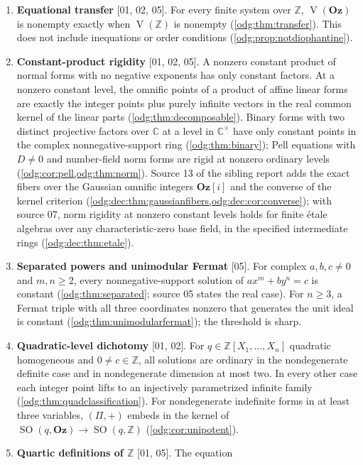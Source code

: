 \documentclass[11pt,oneside]{article}
\numberwithin{equation}{section}
\theoremstyle{definition}
\theoremstyle{remark}
\newcommand{\Oz}{\mathbf{Oz}}
\newcommand{\Z}{\mathbb Z}
\newcommand{\C}{\mathbb C}
\newcommand{\SO}{\operatorname{SO}}
\newcommand{\V}{\operatorname V}
\newcommand{\src}[1]{\textup{\textsf{\small[#1]}}}
\newcommand{\Og}{\Oz[i]}
\begin{document}
\begin{enumerate}[label=\textup{(\arabic*)},leftmargin=*,itemsep=3pt]
\item \textbf{Equational transfer} \src{01, 02, 05}. For every finite system
over $\Z$, $\V(\Oz)$ is nonempty exactly when $\V(\Z)$ is nonempty
(\cref{odg:thm:transfer}). This does not include inequations or order
conditions (\cref{odg:prop:notdiophantine}).
\item \textbf{Constant-product rigidity} \src{01, 02, 05}. A nonzero
constant product of normal forms with no negative exponents has only
constant factors. At a nonzero constant level, the omnific points of a
product of affine linear forms are exactly the integer points plus purely
infinite vectors in the real common kernel of the linear parts
(\cref{odg:thm:decomposable}). Binary forms with two distinct projective
factors over $\C$ at a level in $\C^\times$ have only constant points in the
complex nonnegative-support ring (\cref{odg:thm:binary}); Pell equations with
$D\ne0$ and number-field norm forms are rigid at nonzero ordinary levels
(\cref{odg:cor:pell,odg:thm:norm}). Source 13 of the sibling report adds the
exact fibers over the Gaussian omnific integers $\Og$ and the converse of the
kernel criterion (\cref{odg:dec:thm:gaussianfibers,odg:dec:cor:converse});
with source 07, norm rigidity at nonzero constant levels holds for finite
\'etale algebras over any characteristic-zero base field, in the specified
intermediate rings (\cref{odg:dec:thm:etale}).
\item \textbf{Separated powers and unimodular Fermat} \src{05}. For complex
$a,b,c\ne0$ and $m,n\ge2$, every nonnegative-support solution of
$ax^m+by^n=c$ is constant (\cref{odg:thm:separated}; source 05 states the
real case). For $n\ge3$, a Fermat triple with all three coordinates nonzero
that generates the unit ideal is constant
(\cref{odg:thm:unimodularfermat}); the threshold is sharp.
\item \textbf{Quadratic-level dichotomy} \src{01, 02}. For $q\in\Z[X_1,\ldots,X_n]$
quadratic homogeneous and $0\ne c\in\Z$, all solutions are ordinary in
the nondegenerate definite case and in nondegenerate dimension at most two.
In every other case each integer point lifts to an injectively parametrized
infinite family (\cref{odg:thm:quadclassification}). For nondegenerate indefinite
forms in at least three variables, $(\Pi,+)$ embeds in the kernel of
$\SO(q,\Oz)\to\SO(q,\Z)$ (\cref{odg:cor:unipotent}).
\item \textbf{Quartic definitions of $\Z$} \src{01, 05}. The equation

\end{enumerate}
\end{document}
